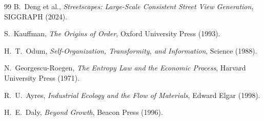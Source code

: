\documentclass[11pt]{article}
\begin{document}
\begin{thebibliography}{99}
B.~Deng et al.,
\newblock \emph{Streetscapes: Large-Scale Consistent Street View Generation},
\newblock SIGGRAPH (2024).

S.~Kauffman,
\newblock \emph{The Origins of Order},
\newblock Oxford University Press (1993).

H.~T.~Odum,
\newblock \emph{Self-Organization, Transformity, and Information},
\newblock Science (1988).

N.~Georgescu-Roegen,
\newblock \emph{The Entropy Law and the Economic Process},
\newblock Harvard University Press (1971).

R.~U.~Ayres,
\newblock \emph{Industrial Ecology and the Flow of Materials},
\newblock Edward Elgar (1998).

H.~E.~Daly,
\newblock \emph{Beyond Growth},
\newblock Beacon Press (1996).

\end{thebibliography}
\end{document}
